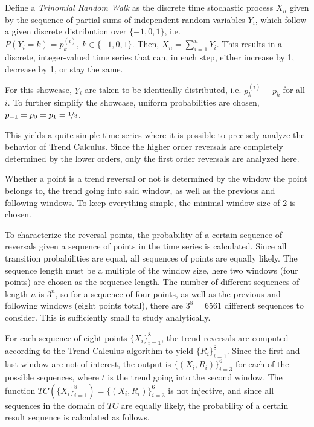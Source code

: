 \documentclass[../trend-calculus.tex]{subfiles}
\begin{document}
  Define a \textit{Trinomial Random Walk} as 
  the discrete time stochastic process $X_n$ given by 
  the sequence of partial sums of independent random variables $Y_i$, which 
  follow a given discrete distribution over $\{ -1, 0, 1 \}$, 
  i.e. $P(Y_i = k) = p_k^{(i)},\ k \in \{-1, 0, 1\}$.
  Then, $X_n = \sum_{i = 1}^n Y_i$.
  This results in a discrete, integer-valued time series that can, 
  in each step, either increase by 1, decrease by 1, or stay the same.

  For this showcase, $Y_i$ are taken to be identically distributed, 
  i.e. $p_k^{(i)} = p_k$ for all $i$.
  To further simplify the showcase, uniform probabilities are chosen, 
  $p_{-1} = p_0 = p_{1} = \nicefrac{1}{3}$.

  This yields a quite simple time series where it is 
  possible to precisely analyze the behavior of Trend Calculus.
  Since the higher order reversals are completely determined by the lower orders, 
  only the first order reversals are analyzed here.
  
  Whether a point is a trend reversal or not is 
  determined by the window the point belongs to, 
  the trend going into said window, 
  as well as the previous and following windows.
  To keep everything simple, the minimal window size of 2 is chosen. 

  To characterize the reversal points, the probability of 
  a certain sequence of reversals given 
  a sequence of points in the time series is calculated.
  Since all transition probabilities are equal, all sequences of points are equally likely.
  The sequence length must be a multiple of the window size, 
  here two windows (four points) are chosen as the sequence length.
  The number of different sequences of length $n$ is $3^n$, 
  so for a sequence of four points, as well as the previous and 
  following windows (eight points total), there are 
  $3^8 = 6561$ different sequences to consider.
  This is sufficiently small to study analytically.

  For each sequence of eight points $\{X_i\}_{i = 1}^8$, 
  the trend reversals are computed according to the Trend Calculus algorithm to 
  yield $\{R_i\}_{i=1}^8$.
  Since the first and last window are not of interest, 
  the output is $\{ (X_i, R_i) \}_{i = 3}^6$ for each of the possible sequences, 
  where $t$ is the trend going into the second window.
  The function $TC(\{X_i\}_{i = 1}^8) = \{ (X_i, R_i) \}_{i = 3}^6$ is not injective, and 
  since all sequences in the domain of $TC$ are equally likely, 
  the probability of a certain result sequence is calculated as follows.
  
\end{document}
